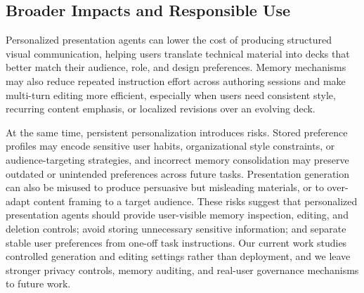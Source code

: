 \documentclass{llmxive}
\begin{document}
\subsection{Broader Impacts and Responsible Use}

Personalized presentation agents can lower the cost of producing structured
visual communication, helping users translate technical material into decks
that better match their audience, role, and design preferences. Memory
mechanisms may also reduce repeated instruction effort across authoring
sessions and make multi-turn editing more efficient, especially when users
need consistent style, recurring content emphasis, or localized revisions over
an evolving deck.

At the same time, persistent personalization introduces risks. Stored
preference profiles may encode sensitive user habits, organizational style
constraints, or audience-targeting strategies, and incorrect memory
consolidation may preserve outdated or unintended preferences across future
tasks. Presentation generation can also be misused to produce persuasive but
misleading materials, or to over-adapt content framing to a target audience.
These risks suggest that personalized presentation agents should provide
user-visible memory inspection, editing, and deletion controls; avoid storing
unnecessary sensitive information; and separate stable user preferences from
one-off task instructions. Our current work studies controlled generation and
editing settings rather than deployment, and we leave stronger privacy
controls, memory auditing, and real-user governance mechanisms to future work.
\end{document}
